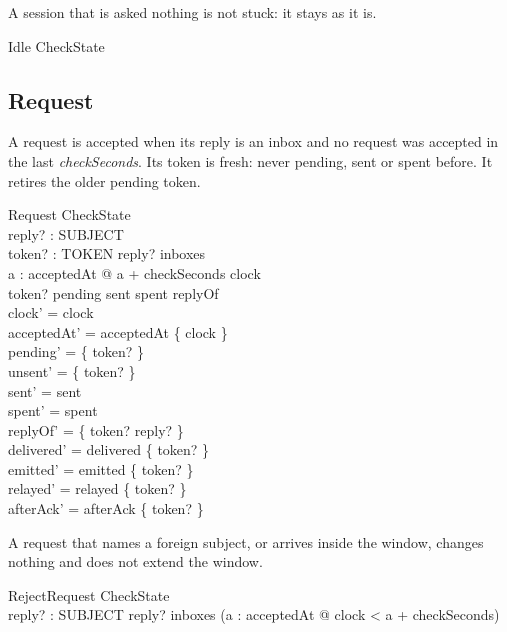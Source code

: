 \documentclass[a4paper,10pt,fleqn]{article}
\begin{document}
A session that is asked nothing is not stuck: it stays as it is.

\begin{schema}{Idle}
  \Xi CheckState
\end{schema}

\subsection{Request}

A request is accepted when its reply is an inbox and no request was accepted in
the last \emph{checkSeconds}.  Its token is fresh: never pending, sent or spent
before.  It retires the older pending token.

\begin{schema}{Request}
  \Delta CheckState \\
  reply? : SUBJECT \\
  token? : TOKEN
\where
  reply? \in inboxes \\
  \forall a : acceptedAt @ a + checkSeconds \leq clock \\
  token? \notin pending \cup sent \cup spent \cup \dom replyOf \\
  clock' = clock \\
  acceptedAt' = acceptedAt \cup \{ clock \} \\
  pending' = \{ token? \} \\
  unsent' = \{ token? \} \\
  sent' = sent \\
  spent' = spent \\
  replyOf' = \{ token? \mapsto reply? \} \\
  delivered' = delivered \oplus \{ token?  \} \\
  emitted' = emitted \oplus \{ token?  \} \\
  relayed' = relayed \oplus \{ token?  \} \\
  afterAck' = afterAck \oplus \{ token?  \}
\end{schema}

A request that names a foreign subject, or arrives inside the window, changes
nothing and does not extend the window.

\begin{schema}{RejectRequest}
  \Xi CheckState \\
  reply? : SUBJECT
\where
  reply? \notin inboxes \lor
    (\exists a : acceptedAt @ clock < a + checkSeconds)
\end{schema}
\end{document}
